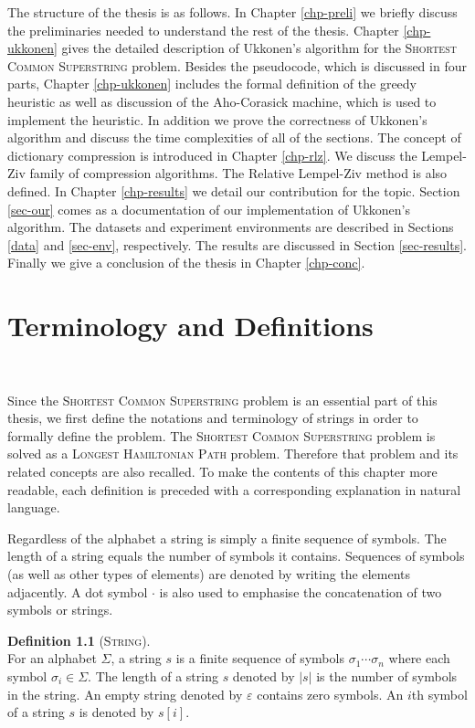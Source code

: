 \documentclass[english,twoside,censored,csm,algorithms-track-2020]{HYthesisML}
\theoremstyle{plain}
\theoremstyle{definition}
\newtheorem{definition}[theorem]{Definition}
\numberwithin{testexample}{chapter}
\begin{document}
The structure of the thesis is as follows. In Chapter \ref{chp-preli} we briefly discuss the
preliminaries needed to understand the rest of the thesis. Chapter \ref{chp-ukkonen} gives the detailed
description of Ukkonen's algorithm for the \textsc{Shortest Common Superstring} problem.
Besides the pseudocode, which is discussed in four parts, Chapter \ref{chp-ukkonen} includes the
formal definition of the greedy heuristic as well as discussion of the Aho-Corasick machine,
which is used to implement the heuristic. In addition we prove the correctness of Ukkonen's algorithm
and discuss the time complexities of all of the sections. The concept of dictionary compression is
introduced in Chapter \ref{chp-rlz}. We discuss the Lempel-Ziv family of compression algorithms. The
Relative Lempel-Ziv method is also defined. In Chapter \ref{chp-results} we detail our contribution for
the topic. Section \ref{sec-our} comes as a documentation of our implementation of Ukkonen's
algorithm. The datasets and experiment environments are described in Sections \ref{data} and
\ref{sec-env}, respectively. The results are discussed in Section \ref{sec-results}.
Finally we give a conclusion of the thesis in Chapter \ref{chp-conc}.


\chapter{Terminology and Definitions}~\label{chp-preli}

Since the \textsc{Shortest Common Superstring} problem is an essential part of this thesis, we
first define the notations and terminology of strings in order to formally define the problem.
The \textsc{Shortest Common Superstring} problem is solved as a \textsc{Longest Hamiltonian Path}
problem. Therefore that problem and its related concepts are also recalled.
To make the contents of this chapter more readable,
each definition is preceded with a corresponding explanation in natural language.

Regardless of the alphabet a string is simply a finite sequence of symbols.
The length of a string equals the number of symbols it contains. Sequences of symbols
(as well as other types of elements) are denoted by writing the elements adjacently.
A dot symbol $\cdot$ is also used to emphasise the concatenation of two symbols or strings.

\begin{definition}[\textsc{String}]~\label{def-string}\\
  For an alphabet $\Sigma$, a string $s$ is a finite sequence of symbols  ${\sigma_1\cdots \sigma_n}$ where each symbol $\sigma_i \in \Sigma$.
  The length of a string $s$ denoted by $|s|$ is the number of symbols in the string.
  An empty string denoted by $\varepsilon$ contains zero symbols. An $i$th symbol of a string $s$
  is denoted by $s[i]$.
\end{definition}
\end{document}
